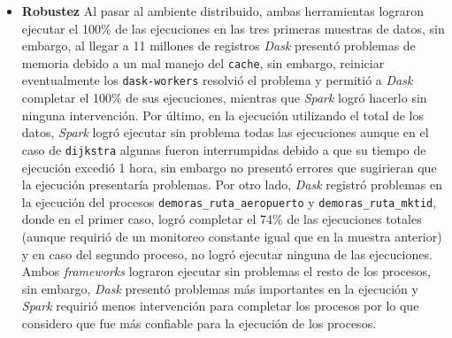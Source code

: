 \begin{itemize}
	
	\item \textbf{Robustez} Al pasar al ambiente distribuido, ambas herramientas lograron ejecutar el 100\% de las ejecuciones en las tres primeras muestras de datos, sin embargo, al llegar a 11 millones de registros \textit{Dask} presentó problemas de memoria debido a un mal manejo del \texttt{cache}, sin embargo, reiniciar eventualmente los \texttt{dask-workers} resolvió el problema y permitió a \textit{Dask} completar el 100\% de sus ejecuciones, mientras que \textit{Spark} logró hacerlo sin ninguna intervención. Por último, en la ejecución utilizando el total de los datos, \textit{Spark} logró ejecutar sin problema todas las ejecuciones aunque en el caso de \texttt{dijkstra} algunas fueron interrumpidas debido a que su tiempo de ejecución excedió 1 hora, sin embargo no presentó errores que sugirieran que la ejecución presentaría problemas. Por otro lado, \textit{Dask} registró problemas en la ejecución del procesos \texttt{demoras\_ruta\_aeropuerto} y \texttt{demoras\_ruta\_mktid}, donde en el primer caso, logró completar el 74\% de las ejecuciones totales (aunque requirió de un monitoreo constante igual que en la muestra anterior) y en caso del segundo proceso, no logró ejecutar ninguna de las ejecuciones. Ambos \textit{frameworks} lograron ejecutar sin problemas el resto de los procesos, sin embargo, \textit{Dask} presentó problemas más importantes en la ejecución y \textit{Spark} requirió menos intervención para completar los procesos por lo que considero que fue más confiable para la ejecución de los procesos.
	

\end{itemize}
